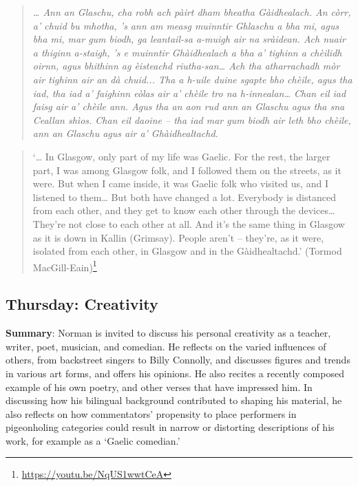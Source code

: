 \documentclass[output=paper,colorlinks,citecolor=brown]{langscibook}
\begin{document}
\begin{quote}
\textit{… Ann an Glaschu, cha robh ach pàirt dham bheatha Gàidhealach. An còrr, a’ chuid bu mhotha, ’s ann am measg muinntir Ghlaschu a bha mi, agus bha mi, mar gum biodh, ga leantail-sa a-muigh air na sràidean. Ach nuair a thiginn a-staigh, ’s e muinntir Ghàidhealach a bha a’ tighinn a chèilidh oirnn, agus bhithinn ag èisteachd riutha-san… Ach tha atharrachadh mòr air tighinn air an dà chuid... Tha a h-uile duine sgapte bho chèile, agus tha iad, tha iad a’ faighinn eòlas air a’ chèile tro na h-innealan… Chan eil iad faisg air a’ chèile ann. Agus tha an aon rud ann an Glaschu agus tha sna Ceallan shìos. Chan eil daoine – tha iad mar gum biodh air leth bho chèile, ann an Glaschu agus air a’ Ghàidhealtachd.}
\end{quote}

\begin{quote}
`… In Glasgow, only part of my life was Gaelic. For the rest, the larger part, I was among Glasgow folk, and I followed them on the streets, as it were. But when I came inside, it was Gaelic folk who visited us, and I listened to them… But both have changed a lot. Everybody is distanced from each other, and they get to know each other through the devices… They’re not close to each other at all. And it’s the same thing in Glasgow as it is down in Kallin (Grimsay). People aren’t – they’re, as it were, isolated from each other, in Glasgow and in the Gàidhealtachd.' (Tormod MacGill-Eain)\footnote{\url{https://youtu.be/NqUS1wwtCeA}}
\end{quote}


\subsection{Thursday: Creativity}

\textbf{Summary}: Norman is invited to discuss his personal creativity as a teacher, writer, poet, musician, and comedian. He reflects on the varied influences of others, from backstreet singers to Billy Connolly, and discusses figures and trends in various art forms, and offers his opinions. He also recites a recently composed example of his own poetry, and other verses that have impressed him. In discussing how his bilingual background contributed to shaping his material, he also reflects on how commentators’ propensity to place performers in pigeonholing categories could result in narrow or distorting descriptions of his work, for example as a `Gaelic comedian.'
\end{document}
